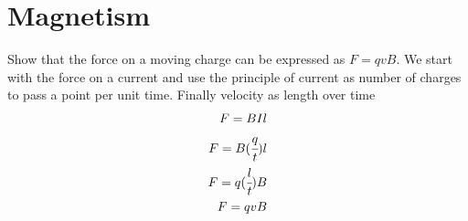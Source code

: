 \documentclass[10pt,a4paper]{article}
\begin{document}
\section{Magnetism}
Show that the force on a moving charge can be expressed as $F=qvB$. We start with the force on a current and use the principle of current as number of charges to pass a point per unit time. Finally velocity as length over time
\begin{align*}
    F=BIl \\
    F= B(\cfrac{q}{t})l \\
    F = q(\cfrac{l}{t}) B \\ 
    F = qvB
\end{align*}
\end{document}
